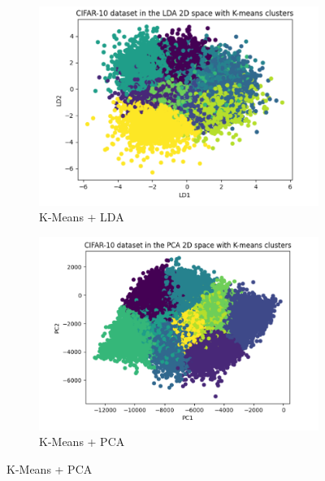 \documentclass[a4paper]{article}
\theoremstyle{plain}
\theoremstyle{definition}
\begin{document}
{ 
\begin{figure}[h]
\centering
\begin{subfigure}{0.32\textwidth} %
  \centering
  \includegraphics[width=\linewidth]{Figures/LDA+k-means.png} %
  \captionsetup{font=scriptsize} %
  \caption{K-Means + LDA}
  \label{fig:sub4}
\end{subfigure}%
\hfill %
\begin{subfigure}{0.32\textwidth} %
  \centering
  \includegraphics[width=\linewidth]{Figures/PCA+k-means.png}
  \captionsetup{font=scriptsize} %
  \caption {K-Means + PCA}
  \label{fig:sub5}
\end{subfigure}

\end{figure}}
\end{document}
